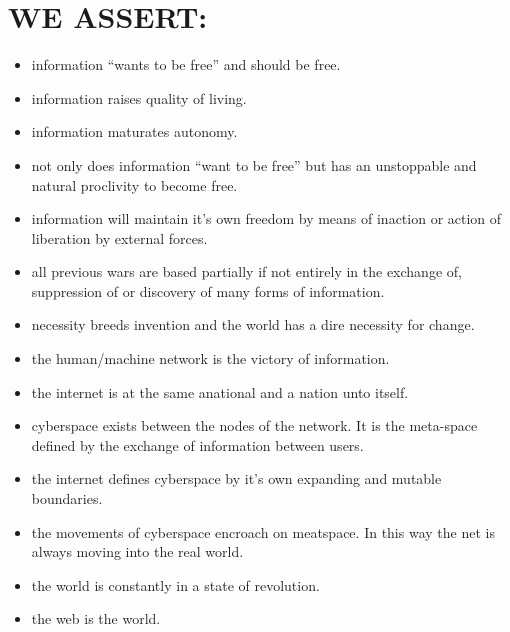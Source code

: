 \documentclass[letterpaper,12pt,english]{sphinxmanual}
\begin{document}
\section{WE ASSERT:}
\label{2011:we-assert}\begin{itemize}
\item {} 
information ``wants to be free'' and should be free.

\item {} 
information raises quality of living.

\item {} 
information maturates autonomy.

\item {} 
not only does information ``want to be free'' but has an unstoppable and natural proclivity to become free.

\item {} 
information will maintain it's own freedom by means of inaction or action of liberation by external forces.

\item {} 
all previous wars are based partially if not entirely in the exchange of, suppression of or discovery of many forms of information.

\item {} 
necessity breeds invention and the world has a dire necessity for change.

\item {} 
the human/machine network is the victory of information.

\item {} 
the internet is at the same anational and a nation unto itself.

\item {} 
cyberspace exists between the nodes of the network. It is the meta-space defined by the exchange of information between users.

\item {} 
the internet defines cyberspace by it's own expanding and mutable boundaries.

\item {} 
the movements of cyberspace encroach on meatspace. In this way the net is always moving into the real world.

\item {} 
the world is constantly in a state of revolution.

\item {} 
the web is the world.

\end{itemize}
\end{document}
